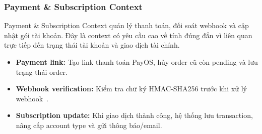 \subsubsection{Payment \& Subscription Context}
\label{subsubsec:payment-subscription-context}

Payment \& Subscription Context quản lý thanh toán, đối soát webhook và cập nhật gói tài khoản. Đây là context có yêu cầu cao về tính đúng đắn vì liên quan trực tiếp đến trạng thái tài khoản và giao dịch tài chính.

\begin{itemize}
    \item \textbf{Payment link:} Tạo link thanh toán PayOS, hủy order cũ còn pending và lưu trạng thái order.
    \item \textbf{Webhook verification:} Kiểm tra chữ ký HMAC-SHA256 trước khi xử lý webhook~\cite{payoswebhook}.
    \item \textbf{Subscription update:} Khi giao dịch thành công, hệ thống lưu transaction, nâng cấp account type và gửi thông báo/email.
\end{itemize}